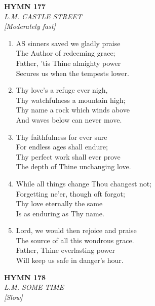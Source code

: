 \newpage
\begin{center}
    {\Large \textbf{HYMN 177}}
    \\
    \textit{L.M. CASTLE STREET}
    \\
    \textit{\small [Moderately fast]}
\end{center}
\vspace{1em}

\begin{enumerate}
    \item AS sinners saved we gladly praise \\
        The Author of redeeming grace; \\
        Father, 'tis Thine almighty power \\
        Secures us when the tempests lower.

    \item Thy love's a refuge ever nigh, \\
        Thy watchfulness a mountain high; \\
        Thy name a rock which winds above \\
        And waves below can never move.

    \item Thy faithfulness for ever sure \\
        For endless ages shall endure; \\
        Thy perfect work shall ever prove \\
        The depth of Thine unchanging love.

    \item While all things change Thou changest not; \\
        Forgetting ne'er, though oft forgot; \\
        Thy love eternally the same \\
        Is as enduring as Thy name.

    \item Lord, we would then rejoice and praise \\
        The source of all this wondrous grace. \\
        Father, Thine everlasting power \\
        Will keep us safe in danger's hour.

\end{enumerate}

\newpage
\begin{center}
    {\Large \textbf{HYMN 178}}
    \\
    \textit{L.M. SOME TIME}
    \\
    \textit{\small [Slow]}
\end{center}
\vspace{1em}

